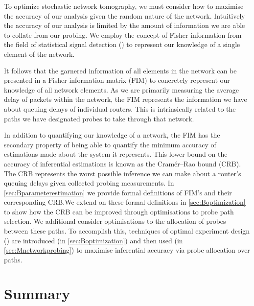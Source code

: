 To optimize stochastic network tomography, we must consider how to maximise the accuracy of our analysis given the random nature of the network. Intuitively the accuracy of our analysis is limited by the amount of information we are able to collate from our probing. We employ the concept of Fisher information from the field of statistical signal detection (\cite{poor_introduction_1994}) to represent our knowledge of a single element of the network.\par
It follows that the garnered information of all elements in the network can be presented in a Fisher information matrix (FIM) to concretely represent our knowledge of all network elements. As we are primarily measuring the average delay of packets within the network, the FIM represents the information we have about queuing delays of individual routers. This is intrinsically related to the paths we have designated probes to take through that network.\par
In addition to quantifying our knowledge of a network, the FIM has the secondary property of being able to quantify the minimum accuracy of estimations made about the system it represents. This lower bound on the accuracy of inferential estimations is known as the Cramér–Rao bound (CRB). The CRB represents the worst possible inference we can make about a router's queuing delays given collected probing measurements. In \cref{sec:Bparameterestimation} we provide formal definitions of FIM's and their corresponding CRB.We extend on these formal definitions in \cref{sec:Boptimization} to show how the CRB can be improved through optimisations to probe path selection. We additional consider optimisations to the allocation of probes between these paths. To accomplish this, techniques of optimal experiment design (\cite{anthony_c_optimum_1996}) are introduced (in \cref{sec:Boptimization}) and then used (in \cref{sec:Mnetworkprobing}) to maximise inferential accuracy via probe allocation over paths.\par

\section{Summary}
\label{sec:Iintroductionsummary}

